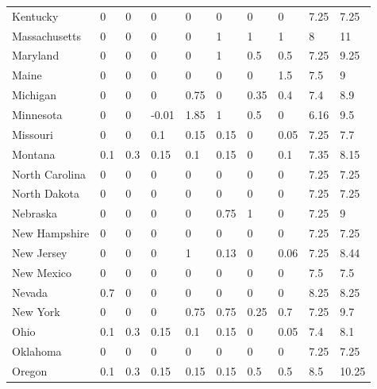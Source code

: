 \begin{table}[H]
{\begin{tabular}{@{}llllllllll@{}}
            Kentucky       & 0    & 0    & 0     & 0    & 0    & 0    & 0    & 7.25     & 7.25   \\
            Massachusetts  & 0    & 0    & 0     & 0    & 1    & 1    & 1    & 8        & 11     \\
            Maryland       & 0    & 0    & 0     & 0    & 1    & 0.5  & 0.5  & 7.25     & 9.25   \\
            Maine          & 0    & 0    & 0     & 0    & 0    & 0    & 1.5  & 7.5      & 9      \\
            Michigan       & 0    & 0    & 0     & 0.75 & 0    & 0.35 & 0.4  & 7.4      & 8.9    \\
            Minnesota      & 0    & 0    & -0.01 & 1.85 & 1    & 0.5  & 0    & 6.16     & 9.5    \\
            Missouri       & 0    & 0    & 0.1   & 0.15 & 0.15 & 0    & 0.05 & 7.25     & 7.7    \\
            Montana        & 0.1  & 0.3  & 0.15  & 0.1  & 0.15 & 0    & 0.1  & 7.35     & 8.15   \\
            North Carolina & 0    & 0    & 0     & 0    & 0    & 0    & 0    & 7.25     & 7.25   \\
            North Dakota   & 0    & 0    & 0     & 0    & 0    & 0    & 0    & 7.25     & 7.25   \\
            Nebraska       & 0    & 0    & 0     & 0    & 0.75 & 1    & 0    & 7.25     & 9      \\
            New Hampshire  & 0    & 0    & 0     & 0    & 0    & 0    & 0    & 7.25     & 7.25   \\
            New Jersey     & 0    & 0    & 0     & 1    & 0.13 & 0    & 0.06 & 7.25     & 8.44   \\
            New Mexico     & 0    & 0    & 0     & 0    & 0    & 0    & 0    & 7.5      & 7.5    \\
            Nevada         & 0.7  & 0    & 0     & 0    & 0    & 0    & 0    & 8.25     & 8.25   \\
            New York       & 0    & 0    & 0     & 0.75 & 0.75 & 0.25 & 0.7  & 7.25     & 9.7    \\
            Ohio           & 0.1  & 0.3  & 0.15  & 0.1  & 0.15 & 0    & 0.05 & 7.4      & 8.1    \\
            Oklahoma       & 0    & 0    & 0     & 0    & 0    & 0    & 0    & 7.25     & 7.25   \\
            Oregon         & 0.1  & 0.3  & 0.15  & 0.15 & 0.15 & 0.5  & 0.5  & 8.5      & 10.25  \\

\end{tabular}}
\end{table}
